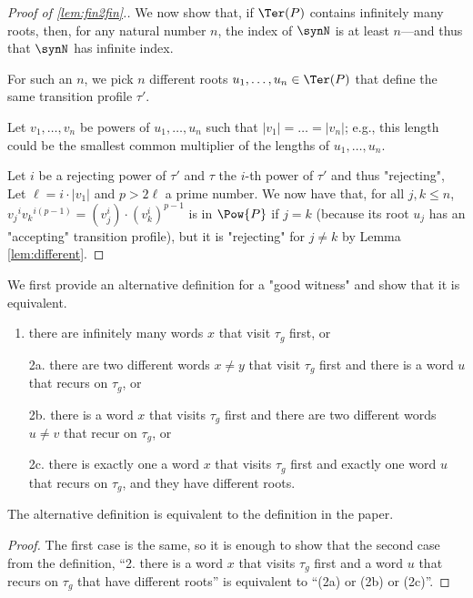 \documentclass[a4paper,USenglish,cleveref,autoref,thm-restate]{lipics-v2021}
\begin{document}
{\begin{proof}[Proof of \cref{lem:fin2fin}.]
    We now show that, if $\Ter(P)$ contains infinitely many roots, then, for any natural number $n$, the index of $\synN$ is at least $n$---and thus that $\synN$ has infinite index.

    For such an $n$, we pick $n$ different roots $u_1,\ldots,u_n \in \Ter(P)$ that define the same transition profile $\tau'$.

    Let $v_1,\ldots,v_n$ be powers of $u_1,\ldots,u_n$ such that $|v_1|=\ldots=|v_n|$; e.g., this length could be the smallest common multiplier of the lengths of $u_1,\ldots,u_n$.

    Let $i$ be a rejecting power of $\tau'$ and $\tau$ the $i$-th power of $\tau'$ and thus "rejecting", Let $\ell = i \cdot |v_1|$ and $p>2\ell$ a prime number.
    We now have that, for all $j,k\leq n$, ${v_j}^{i}{v_k}^{i(p-1)} = (v_j^i)\cdot (v_k^i)^{p-1}$ is in $\Pow{P}$ if $j=k$ (because its root $u_j$ has an "accepting" transition profile), but it is "rejecting" for $j\neq k$ by Lemma \ref{lem:different}.
\end{proof}



\rstInfiniteGoodness*

We first provide an alternative definition for a "good witness" and show that it is equivalent.

\begin{enumerate}
    \item there are infinitely many words $x$ that visit $\tau_g$ first, or
    \item[2a.] there are two different
          words $x\neq y$ that visit $\tau_g$ first and there is a word $u$ that recurs on $\tau_g$, or
    \item[2b.] there is a word $x$ that visits $\tau_g$ first and there are two different
          words $u \neq v$ that recur on $\tau_g$, or
    \item[2c.] there is exactly one a word $x$ that visits $\tau_g$ first and exactly one word $u$ that recurs on $\tau_g$, and they have different roots.
\end{enumerate}

\begin{lemma}\label{lem:sameGoodness}
    The alternative definition is equivalent to the definition in the paper.
\end{lemma}

\begin{proof}
    The first case is the same, so it is enough to show that the second case from the definition, ``2. there is a word $x$ that visits $\tau_g$ first and a word $u$ that recurs on $\tau_g$ that have different roots'' is equivalent to ``(2a) or (2b) or (2c)''.


\end{proof}}
\end{document}
